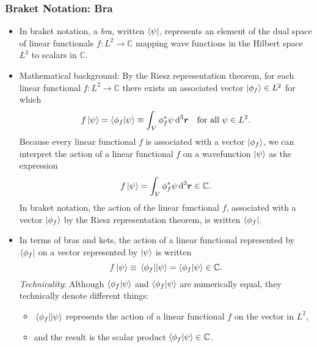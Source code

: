 \documentclass[11pt, a4paper]{article}
\newcommand{\diff}{\mathop{}\!\mathrm{d}} %
\newcommand{\dr}{\diff^{3} \r}  %
\renewcommand{\vec}[1]{\bm{#1}}  %
\renewcommand{\r}{\vec{r}}  %
\begin{document}
\subsubsection{Braket Notation: Bra}
\begin{itemize}

    \item In braket notation, a \textit{bra}, written $ \bra{\psi} $, represents an element of the dual space of linear functionals $ f : L^{2} \to \mathbb{C} $ mapping wave functions in the Hilbert space $ L^{2} $ to scalars in $ \mathbb{C} $. 

    \item Mathematical background: By the Riesz representation theorem, for each linear functional $ f:L^{2} \to \mathbb{C} $ there exists an associated vector $ \ket{\phi_{f}} \in L^{2} $ for which 
	\begin{equation*}
		f\ket{\psi} = \braket{\phi_{f}}{\psi} \equiv \int_{V} \phi_{f}^{*} \psi \dr  \quad \text{for all } \psi \in L^{2}.
	\end{equation*}
	Because every linear functional $ f $ is associated with a vector $ \ket{\phi_{f}} $, we can interpret the action of a linear functional $ f $ on a wavefunction $ \ket{\psi} $ as the expression
	\begin{equation*}
		f\ket{\psi} =  \int_{V} \phi_{f}^{*} \psi \dr \in \mathbb{C}.
	\end{equation*}
    In braket notation, the action of the linear functional $ f $, associated with a vector $ \ket{\phi_{f}} $ by the Riesz representation theorem, is written $ \bra{\phi_{f}} $. 

    \item In terms of bras and kets, the action of a linear functional represented by $ \bra{\phi_{f}} $ on a vector represented by $ \ket{\psi} $ is written
	\begin{equation*}
		f \ket{\psi} \equiv \mel{\phi_{f}}{}{\psi} = \braket{\phi_{f}}{\psi} \in \mathbb{C}.
	\end{equation*}
    \textit{Technicality}: Although $ \bra{\phi_{f}} \ket{\psi} $ and $ \braket{\phi_{f}}{\psi} $ are numerically equal, they technically denote different things:
    \begin{itemize}
        \item $ \mel{\phi_{f}}{}{\psi}  $ represents the action of a linear functional $ f $ on the vector in $ L^{2} $, 

        \item and the result is the scalar product $ \braket{\phi_{f}}{\psi} \in \mathbb{C} $.
    \end{itemize}

\end{itemize}
\end{document}
